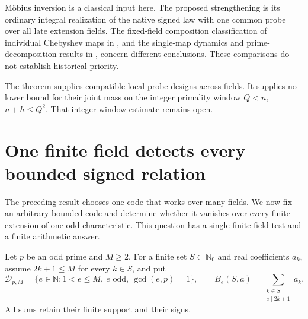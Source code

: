 \documentclass[11pt]{article}
\begin{document}
M\"obius inversion is a classical input here.
The proposed strengthening is its ordinary integral realization of the
native signed law with one common probe over all late extension fields.
The fixed-field composition classification of individual Chebyshev maps
in \cite{RosenScherrWeissZieveChebyshev}, and the single-map dynamics and
prime-decomposition results in \cite{GassertChebyshevGraphs}, concern
different conclusions.  These comparisons do not establish historical
priority.

The theorem supplies compatible local probe designs across fields.
It supplies no lower bound for their joint mass on the integer primality
window \(Q<n\), \(n+h\le Q^2\).  That integer-window estimate remains open.
\section{One finite field detects every bounded signed relation}
\label{sec:odd-pell-finite-detector}

The preceding result chooses one code that works over many fields.
We now fix an arbitrary bounded code and determine whether it vanishes
over every finite extension of one odd characteristic.  This question
has a single finite-field test and a finite arithmetic answer.

Let \(p\) be an odd prime and \(M\ge2\).  For a finite set
\(S\subset\mathbb N_0\) and real coefficients \(a_k\), assume
\(2k+1\le M\) for every \(k\in S\), and put
\[
 \mathcal D_{p,M}
   =\{e\in\mathbb N:1<e\le M,\ e\text{ odd},\ \gcd(e,p)=1\},
 \qquad
 B_e(S,a)=\sum_{\substack{k\in S\\e\mid 2k+1}}a_k.
\]
All sums retain their finite support and their signs.
\end{document}
